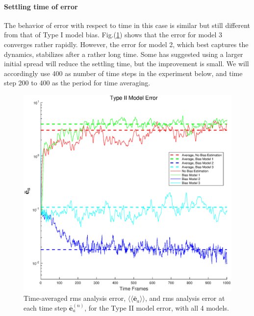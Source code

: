 \documentclass[twocolumn]{article}
\begin{document}
\paragraph{Settling time of error}
The behavior of error with respect to time in this case is similar but still different from that of Type I model bias. Fig.(\ref{ErrVsTimeM2.1}) shows that the error for model 3 converges rather rapidly. However, the error for model 2, which best captures the dynamics, stabilizes after a rather long time. Some has suggested using a larger initial spread will reduce the settling time, but the improvement is small. We will accordingly use 400 as number of time steps in the experiment below, and time step 200 to 400 as the period for time averaging.
\begin{figure} 
\centering
\includegraphics[scale=0.3]{Figures/ErrVsTimeM2_1}
\caption{Time-averaged rms analysis error, $\langle\langle\bar{\pmb{e}}_a\rangle\rangle$, and rms analysis error at each time step $\bar{\pmb{e}}_a^{(n)}$, for the Type II model error, with all 4 models.}
\label{ErrVsTimeM2.1}
\end{figure}
\end{document}
